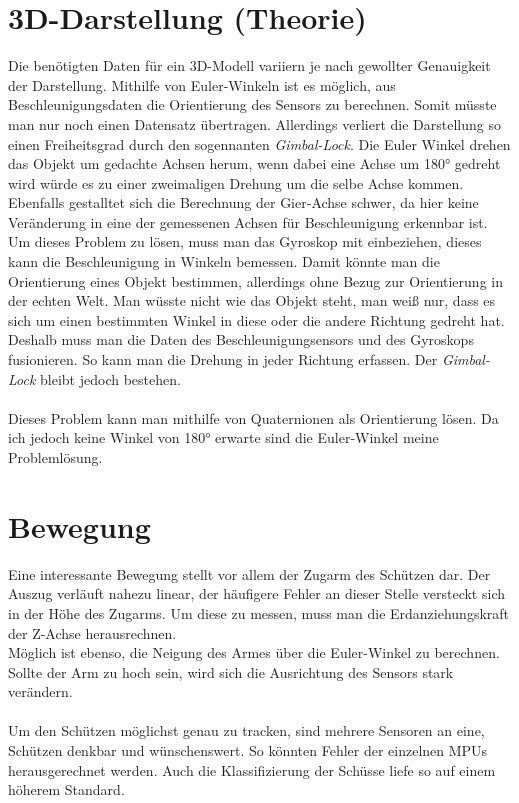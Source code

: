 \section{3D-Darstellung (Theorie)}
Die benötigten Daten für ein 3D-Modell variiern je nach gewollter Genauigkeit der Darstellung.
Mithilfe von Euler-Winkeln ist es möglich, aus Beschleunigungsdaten die Orientierung des Sensors zu berechnen.
Somit müsste man nur noch einen Datensatz übertragen. Allerdings verliert die Darstellung so einen
Freiheitsgrad durch den sogennanten \textit{Gimbal-Lock}. Die Euler Winkel drehen das Objekt um gedachte
Achsen herum, wenn dabei eine Achse um 180° gedreht wird würde es zu einer zweimaligen Drehung
um die selbe Achse kommen. Ebenfalls gestalltet sich die Berechnung der Gier-Achse schwer, da hier
keine Veränderung in eine der gemessenen Achsen für Beschleunigung erkennbar ist.
\\
Um dieses Problem zu lösen, muss man das Gyroskop mit einbeziehen, dieses kann die Beschleunigung
in Winkeln bemessen. Damit könnte man die Orientierung eines Objekt bestimmen, allerdings ohne 
Bezug zur Orientierung in der echten Welt. Man wüsste nicht wie das Objekt steht, man weiß nur, 
dass es sich um einen bestimmten Winkel in diese oder die andere Richtung gedreht hat. \\
Deshalb muss man die Daten des Beschleunigungsensors und des Gyroskops fusionieren. So kann man 
die Drehung in jeder Richtung erfassen. Der \textit{Gimbal-Lock} bleibt jedoch bestehen.\\
\\
Dieses Problem kann man mithilfe von Quaternionen als Orientierung lösen. Da ich jedoch keine 
Winkel von 180° erwarte sind die Euler-Winkel meine Problemlösung.

\section {Bewegung}
Eine interessante Bewegung stellt vor allem der Zugarm des 
Schützen dar. Der Auszug verläuft nahezu linear, der häufigere Fehler 
an dieser Stelle versteckt sich in der Höhe des Zugarms. 
Um diese zu messen, muss man die Erdanziehungskraft der Z-Achse herausrechnen.\\
Möglich ist ebenso, die Neigung des Armes über die Euler-Winkel zu berechnen. Sollte 
der Arm zu hoch sein, wird sich die Ausrichtung des Sensors stark verändern.\\
\\
Um den Schützen möglichst genau zu tracken, sind mehrere Sensoren an eine, Schützen denkbar und
wünschenswert. So könnten Fehler der einzelnen MPUs herausgerechnet werden.
Auch die Klassifizierung der Schüsse liefe so auf einem höherem Standard.